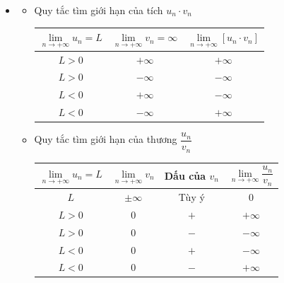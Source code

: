 \begin{itemize}
	\item [\iconMT] 
	\begin{itemize}
		\item [\ding{172}] Quy tắc tìm giới hạn của tích $u_n\cdot v_n$
		\begin{center}
			\begin{tabular}{|c|c|c|}
				\hline
				$\lim\limits_{n \to +\infty}u_n=L$ & $\lim\limits_{n \to +\infty}v_n = \infty$   & $\lim\limits_{n \to +\infty}\left[{u_n\cdot v_n}\right]$ \\
				\hline
				$L>0$   & $+\infty $   & $+\infty $ \\
				\hline
				$L>0$    & $-\infty $    & $-\infty $ \\
				\hline
				$L<0$   & $+\infty $   & $-\infty $ \\
				\hline
				$L<0$    & $-\infty $    & $+\infty $ \\
				\hline
			\end{tabular}
		\end{center}
		\item [\ding{173}]Quy tắc tìm giới hạn của thương $\dfrac{u_n}{v_n}$
		\begin{center}
			\begin{tabular}{|c|c|c|c|}
				\hline
				$\lim\limits_{n \to +\infty}u_n=L$ & $\lim\limits_{n \to +\infty}v_n$   & Dấu của $v_n$ & $\lim\limits_{n \to +\infty}\dfrac{u_n}{v_n}$\\
				\hline
				$L$   & $\pm \infty $   & Tùy ý & $0$\\
				\hline
				$L>0$   & $0$   & $+$ & $+\infty $\\
				\hline
				$L>0$    & $0$   & $-$ & $-\infty $\\
				\hline
				$L<0$   & $0$   & $+$ & $-\infty $\\
				\hline
				$L<0$    & $0$    & $-$ & $+\infty $\\
				\hline
			\end{tabular}
		\end{center}  
	\end{itemize}
\end{itemize}


